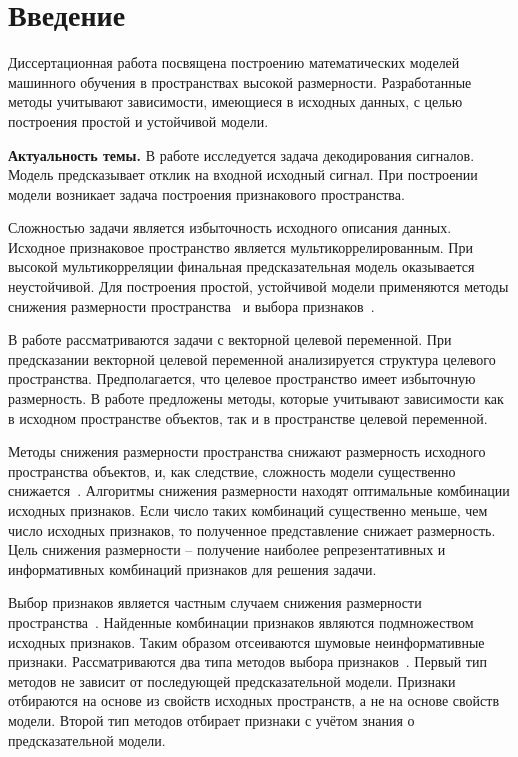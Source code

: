 \chapter*{Введение}

Диссертационная работа посвящена построению математических моделей машинного обучения в пространствах высокой размерности.
Разработанные методы учитывают зависимости, имеющиеся в исходных данных, с целью построения простой и устойчивой модели.

\textbf{Актуальность темы.} 
В работе исследуется задача декодирования сигналов. 
Модель предсказывает отклик на входной исходный сигнал.
При построении модели возникает задача построения признакового пространства. 

Сложностью задачи является избыточность исходного описания данных. 
Исходное признаковое пространство является мультикоррелированным.
При высокой мультикорреляции финальная предсказательная модель оказывается неустойчивой.
Для построения простой, устойчивой модели применяются методы снижения размерности пространства~\cite{chun2010sparse,mehmood2012review}  и выбора признаков~\cite{katrutsa2015stress,li2017feature}.

В работе рассматриваются задачи с векторной целевой переменной. 
При предсказании векторной целевой переменной анализируется структура целевого пространства.
Предполагается, что целевое пространство имеет избыточную размерность.
В работе предложены методы, которые учитывают зависимости как в исходном пространстве объектов, так и в пространстве целевой переменной.

Методы снижения размерности пространства снижают размерность исходного пространства объектов, и, как следствие, сложность модели существенно снижается~\cite{tipping1999probabilisticpca,wold1975path,hotelling1992relations}. 
Алгоритмы снижения размерности находят оптимальные комбинации исходных признаков. 
Если число таких комбинаций существенно меньше, чем число исходных признаков, то полученное представление снижает размерность.
Цель снижения размерности -- получение наиболее репрезентативных и информативных комбинаций признаков для решения задачи.

Выбор признаков является частным случаем снижения размерности пространства~\cite{katrutsa2015stress,katrutsa2017comprehensive}. 
Найденные комбинации признаков являются подмножеством исходных признаков.
Таким образом отсеиваются шумовые неинформативные признаки.
Рассматриваются два типа методов выбора признаков~\cite{li2017feature,rodriguez2010quadratic,friedman2001elements}.
Первый тип методов не зависит от последующей предсказательной модели.
Признаки отбираются на основе из свойств исходных пространств, а не на основе свойств модели.
Второй тип методов отбирает признаки с учётом знания о предсказательной модели. 

